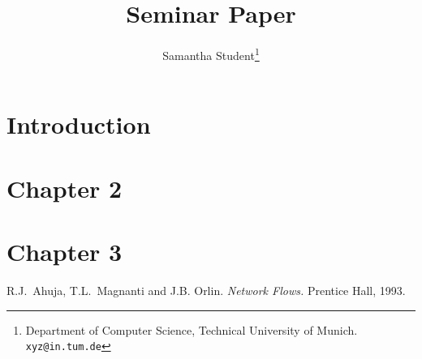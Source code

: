 \documentclass[11pt,psfig,times]{article}
\begin{document}
\title{Seminar Paper}
\author{Samantha Student\thanks{Department of Computer Science, Technical University of Munich. {\tt xyz@in.tum.de}}}
\date{}
\maketitle

\section{Introduction}

\section{Chapter 2}

\section{Chapter 3}



\begin{thebibliography}{10}
\setlength{\itemsep}{0pt plus .3pt}
\setlength{\parsep}{0pt plus .3pt}
\setlength{\parskip}{0pt plus .3pt}

R.J.\ Ahuja, T.L.\ Magnanti and J.B. Orlin. {\em Network Flows.\/} Prentice Hall, 1993.
\end{thebibliography}
\end{document}
